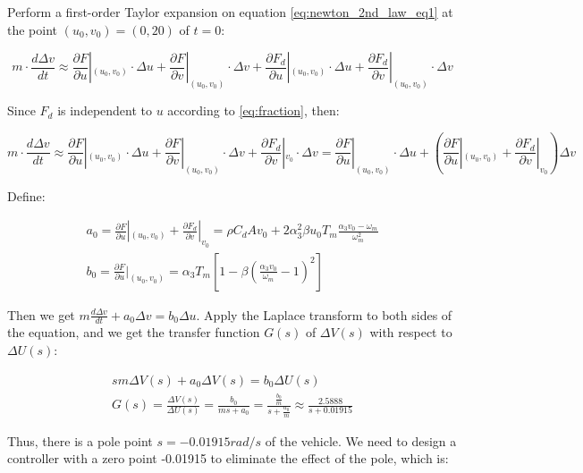 \documentclass[12pt]{article}
\begin{document}
Perform a first-order Taylor expansion on equation \ref{eq:newton_2nd_law_eq1} at the point $(u_0, v_0) = (0, 20)$ of $t=0$:

\begin{equation}
    m\cdot \frac{d\Delta v}{dt} \approx 
    \frac{\partial F}{\partial u}|_{(u_0, v_0)} \cdot \Delta u + 
    \frac{\partial F}{\partial v}|_{(u_0, v_0)} \cdot \Delta v +
    \frac{\partial F_d}{\partial u}|_{(u_0, v_0)} \cdot \Delta u +
    \frac{\partial F_d}{\partial v}|_{(u_0, v_0)} \cdot \Delta v
    \label{eq:taylor1}
\end{equation}

Since $F_d$ is independent to $u$ according to \ref{eq:fraction}, then:

\begin{equation}
    m\cdot \frac{d\Delta v}{dt} \approx 
    \frac{\partial F}{\partial u}|_{(u_0, v_0)} \cdot \Delta u + 
    \frac{\partial F}{\partial v}|_{(u_0, v_0)} \cdot \Delta v +
    \frac{\partial F_d}{\partial v}|_{v_0} \cdot \Delta v = 
    \frac{\partial F}{\partial u}|_{(u_0, v_0)} \cdot \Delta u + 
    (\frac{\partial F}{\partial u}|_{(u_0, v_0)} + \frac{\partial F_d}{\partial v}|_{v_0}) \Delta v
    \label{eq:taylor2}
\end{equation}

Define:

\begin{gather}
    a_0 = \frac{\partial F}{\partial u}|_{(u_0, v_0)} + \frac{\partial F_d}{\partial v}|_{v_0} =
    \rho C_d A v_0 + 2 \alpha_3^2 \beta u_0 T_m \frac{\alpha_3 v_0 - \omega_m}{\omega_m^2}
    \label{wq:a0} \\
    b_0 = \frac{\partial F}{\partial u}|_{(u_0, v_0)} = \alpha_3 T_m [1-\beta(\frac{\alpha_3 v_0}{\omega_m}-1)^2]
    \label{eq:b0}
\end{gather}

Then we get $m\frac{d\Delta v}{dt} + a_0 \Delta v = b_0 \Delta u$. Apply the Laplace transform to both sides of the equation, and we get the transfer function $G(s)$ of $\Delta V(s)$ with respect to $\Delta U(s)$:

\begin{gather}
    sm\Delta V(s) + a_0 \Delta V(s) = b_0 \Delta U(s)
    \label{eq:laplace} \\
    G(s) = \frac{\Delta V(s)}{\Delta U(s)} = \frac{b_0}{ms+a_0} =
    \frac{\frac{b_0}{m}}{s+\frac{a_0}{m}} \approx \frac{2.5888}{s + 0.01915}
    \label{eq:gs}
\end{gather}

Thus, there is a pole point $s = -0.01915 rad/s$ of the vehicle. We need to design a controller with a zero point -0.01915 to eliminate the effect of the pole, which is:
\end{document}

